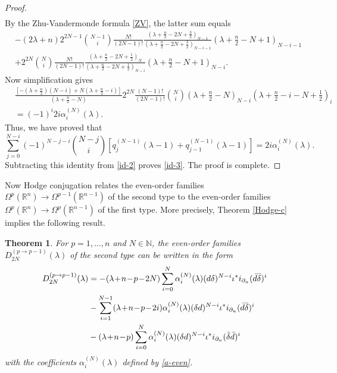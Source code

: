 \documentclass[a4paper,12pt,reqno]{amsart}
\newtheorem{theorem}{Theorem}
\numberwithin{theorem}{subsection}
\numberwithin{equation}{section}
\begin{document}
\begin{proof}
\begin{align*}
\end{align*}
By the Zhu-Vandermonde formula \eqref{ZV}, the latter sum equals
\begin{align*}
   & -(2\lambda\!+\!n) 2^{2N-1} \binom{N-1}{i} \frac{N!}{(2N\!-\!1)!}
   \frac{(\lambda\!+\!\frac{n}{2}\!-\!2N\!+\!\frac{3}{2})_{N-1}}
   {(\lambda\!+\!\frac{n}{2}\!-\!2N\!+\frac{3}{2})_{N-i-1}}(\lambda\!+\!\tfrac{n}{2}\!-\!N\!+\!1)_{N-i-1} \\
   & + 2^{2N} \binom{N}{i} \frac{N!}{(2N\!-\!1)!}
   \frac{(\lambda\!+\!\frac{n}{2}\!-\!2N\!+\!\frac{1}{2})_{N}}{(\lambda\!+\!\frac{n}{2}\!-\!2N\!+\frac{1}{2})_{N-i}}
   (\lambda\!+\!\tfrac{n}{2}\!-\!N\!+\!1)_{N-i}.
\end{align*}
Now simplification gives
\begin{align*}
   & \frac{\left[-(\lambda\!+\!\tfrac{n}{2})(N\!-\!i) + N (\lambda\!+\!\frac{n}{2}\!-\!i)\right]}
   {(\lambda\!+\!\tfrac{n}{2}\!-\!N)}
   2^{2N} \frac{(N\!-\!1)!}{(2N\!-\!1)!} \binom{N}{i} (\lambda\!+\!\tfrac{n}{2}\!-\!N)_{N-i}
   (\lambda\!+\!\tfrac{n}{2}\!-\!i\!-\!N\!+\!\tfrac{1}{2})_i \\
   & = (-1)^i 2i \alpha_i^{(N)}(\lambda).
\end{align*}
Thus, we have proved that
$$
\sum_{j=0}^{N-i} (-1)^{N-j-i} \binom{N-j}{i} \left[q_{j}^{(N-1)}(\lambda\!-\!1)
   + q_{j-1}^{(N-1)}(\lambda\!-\!1)\right] = 2i \alpha_i^{(N)}(\lambda).
$$
Subtracting this identity from \eqref{id-2} proves \eqref{id-3}. The proof is
complete.
\end{proof}

Now Hodge conjugation relates the even-order families $\Omega^p({\mathbb{R}}^n) \to
\Omega^{p-1}({\mathbb{R}}^{n-1})$ of the second type to the even-order families
$\Omega^p({\mathbb{R}}^n) \to \Omega^{p}({\mathbb{R}}^{n-1})$ of the first type. More precisely,
Theorem \ref{Hodge-c} implies the following result.

\begin{theorem}\label{coeffeven2} For $p=1,\dots,n$ and $N \in {\mathbb{N}}$, the even-order
families $D_{2N}^{(p \to p-1)}(\lambda)$ of the second type can be written in
the form
\begin{align}\label{fam-even2}
   D_{2N}^{(p \to p-1)}(\lambda) & = -(\lambda\!+\!n\!-\!p\!-\!2N) \sum_{i=0}^N \alpha_i^{(N)}(\lambda)
   ({d} \delta)^{N-i} \iota^* i_{\partial_n} (\bar{d} \bar{\delta})^i \notag \\
   & - \sum_{i=1}^{N-1} (\lambda\!+\!n\!-\!p\!-\!2i) \alpha_i^{(N)}(\lambda)
   (\delta {d})^{N-i} \iota^* i_{\partial_n} (\bar{d} \bar{\delta})^i \notag \\
   & -(\lambda\!+\!n\!-\!p) \sum_{i=0}^N  \alpha_i^{(N)}(\lambda)
   (\delta {d})^{N-i} \iota^* i_{\partial_n} (\bar{\delta} \bar{d})^i
\end{align}
with the coefficients $\alpha_i^{(N)}(\lambda)$ defined by \eqref{a-even}.
\end{theorem}
\end{document}
